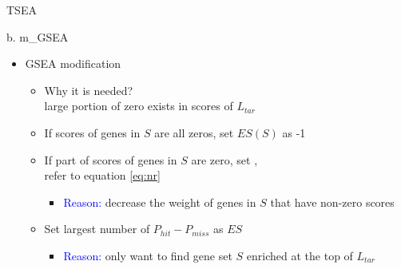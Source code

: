 \documentclass[10pt]{beamer}
\begin{document}
\begin{frame}{TSEA}
  \vspace{-0.55cm}
    \begin{alertblock}{b. m\_GSEA}
        \begin{itemize}
            \item \alert{GSEA modification}
              \begin{itemize}
                \item Why it is needed? \\
                     \alert{large portion of zero exists} in scores of $L_{tar}$
                \item If scores of genes in $S$ are all zeros, set $ES(S)$ as -1
                \item If part of scores of genes in $S$ are zero, set , \\ refer to equation \ref{eq:nr}
                    \begin{itemize}
                        \small \item \textcolor{blue}{Reason:} decrease the weight of genes in $S$ that have non-zero scores \\
                    \end{itemize}
                \item Set largest number of $P_{hit}  - P_{miss}$ as $ES$
                    \begin{itemize}
                        \small \item \textcolor{blue}{Reason:} only want to find gene set $S$ enriched at the top of $L_{tar}$
                    \end{itemize}
            \end{itemize}
        \end{itemize}
    \end{alertblock}
\end{frame}
\end{document}
